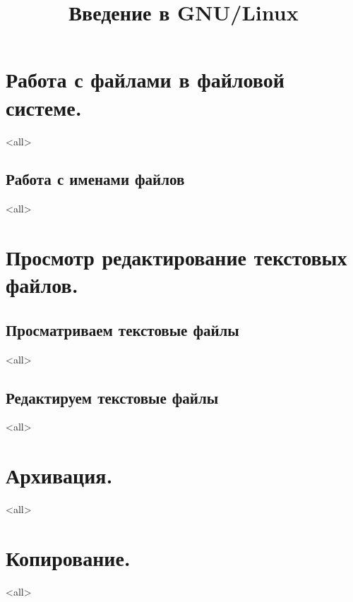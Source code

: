 

\title{Введение в GNU/Linux}




\begin{frame}
	\frametitle{}
	\titlepage
	\vspace{-0.5cm}
	\begin{center}
	\end{center}
\end{frame}


\begin{frame}
	\tableofcontents
	[hideallsubsections]
\end{frame}


\section{Работа с файлами в файловой системе.}
\mode<all>{}
\subsection{Работа с именами файлов}
\mode<all>{}
\section{Просмотр редактирование текстовых файлов.}
\subsection{Просматриваем текстовые файлы}
\mode<all>{}
\subsection{Редактируем текстовые файлы}
\mode<all>{}
\section{Архивация.}
\mode<all>{}
\section{Копирование.}
\mode<all>{}
